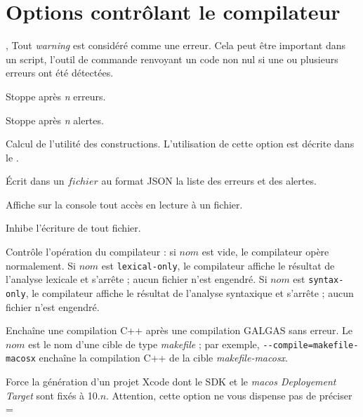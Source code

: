 \section{Options contrôlant le compilateur}





,  Tout \emph{warning} est considéré comme une erreur. Cela peut être important dans un script, l’outil de commande renvoyant un code non nul si une ou plusieurs erreurs ont été détectées.

 Stoppe après \emph{n} erreurs.

 Stoppe après \emph{n} alertes.

 Calcul de l'utilité des constructions. L'utilisation de cette option est décrite dans le .





 Écrit dans un $fichier$ au format JSON la liste des erreurs et des alertes.


 Affiche sur la console tout accès en lecture à un fichier.


 Inhibe l'écriture de tout fichier.


 Contrôle l'opération du compilateur : si $nom$ est vide, le compilateur opère normalement. Si $nom$ est \texttt{lexical-only}, le compilateur affiche le résultat de l'analyse lexicale et s'arrête ; aucun fichier n'est engendré. Si $nom$ est \texttt{syntax-only}, le compilateur affiche le résultat de l'analyse syntaxique et s'arrête ; aucun fichier n'est engendré.





 Enchaîne une compilation C++ après une compilation GALGAS sans erreur. Le $nom$ est le nom d'une cible de type \emph{makefile} ; par exemple, \texttt{-{-}compile=makefile-macosx} enchaîne la compilation C++ de la cible \emph{makefile-macosx}.


 Force la génération d'un projet Xcode dont le SDK et le \emph{macos Deployement Target} sont fixés à 10.$n$.  Attention, cette option ne vous dispense pas de préciser \ggs=%




